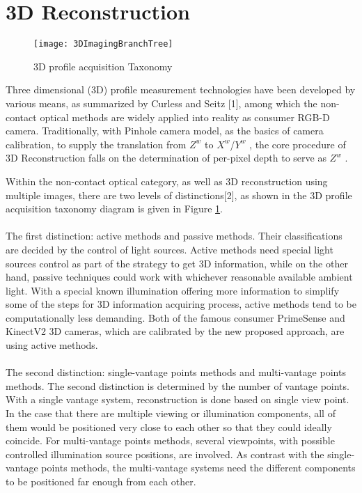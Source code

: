\section{3D Reconstruction}
%
\begin{figure}[h]
\centering
\texttt{[image: 3DImagingBranchTree]}
\caption{ 3D profile acquisition Taxonomy}
\label{3DImagingTaxonomy}
\end{figure}%
\par%
Three dimensional (3D) profile measurement technologies have been developed by various means, as summarized by Curless and Seitz [1], %
among which the non-contact optical methods are widely applied into reality as consumer RGB-D camera. Traditionally, with Pinhole camera model, as the basics of camera calibration, to supply the translation from \(Z^{w}\)  to \(X^{w}\)/\(Y^{w}\) , the core procedure of 3D Reconstruction falls on the determination of per-pixel depth to serve as \(Z^{w}\) .\par%
%
Within the non-contact optical category, as well as 3D reconstruction using multiple images, there are two levels of distinctions[2],
 as shown in the 3D profile acquisition taxonomy diagram is given in Figure \ref{3DImagingTaxonomy}.
 \\\\The first distinction: active methods and passive methods. Their classifications are decided by the control of light sources. Active methods need special light sources control as part of the strategy to get 3D information, while on the other hand, passive techniques could work with whichever reasonable available ambient light. With a special known illumination offering more information to simplify some of the steps for 3D information acquiring process, active methods tend to be computationally less demanding. Both of the famous consumer PrimeSense and KinectV2 3D cameras, which are calibrated by the new proposed approach, are using active methods.
\\\\The second distinction: single-vantage points methods and multi-vantage points methods. The second distinction is determined by the number of vantage points. With a single vantage system, reconstruction is done based on single view point. In the case that there are multiple viewing or illumination components, all of them would be positioned very close to each other so that they could ideally coincide. For multi-vantage points methods, several viewpoints, with possible controlled illumination source positions, are involved. As contrast with the single-vantage points methods, the multi-vantage systems need the different components to be positioned far enough from each other. 
